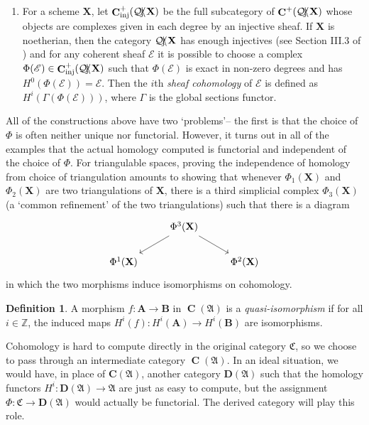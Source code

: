 \documentclass[a4paper]{article}
\theoremstyle{definition}
\newtheorem{defn}{Definition}[section]
\theoremstyle{remark}
\DeclareMathOperator{\Ch}{\mathbf{C}}
\DeclareMathOperator{\Qcoh}{\mathcal{Q \kern -2pt c\kern -3pt o\kern -2pt h\kern -1pt}}
\begin{document}
\begin{enumerate}
    \item For a scheme \(\mathbf{X}\), let
        \(\Ch_{\text{inj}}^+(\Qcoh\mathbf{X})\) be the full subcategory of
        \(\Ch^+(\Qcoh\mathbf{X})\) whose objects are complexes given in each
        degree by an injective sheaf. If \(\mathbf{X}\) is noetherian, then the
        category \(\Qcoh\mathbf{X}\) has enough injectives (see Section III.3 of
        ) and for any coherent sheaf
        \(\mathscr{E}\) it is possible to choose a complex
        \(\Phi(\mathscr{E})\in \Ch^+_{\text{inj}}(\Qcoh\mathbf{X})\) such that
        \(\Phi(\mathscr{E})\) is exact in non-zero degrees and has
        \(H^0(\Phi(\mathscr{E}))=\mathscr{E}\).  Then the \(i\)th \textit{sheaf
        cohomology} of \(\mathscr{E}\) is defined as
        \(H^i(\Gamma(\Phi(\mathscr{E})))\), where \(\Gamma\) is the global
        sections functor.
\end{enumerate}

All of the constructions above have two `problems'-- the first is that the
choice of \(\Phi\) is often neither unique nor functorial. However, it turns out
in all of the examples that the actual homology computed is functorial and
independent of the choice of \(\Phi\). For triangulable spaces, proving the
independence of homology from choice of triangulation amounts to showing that
whenever \(\Phi_1(\mathbf{X})\) and \(\Phi_2(\mathbf{X})\) are two
triangulations of \(\mathbf{X}\), there is a third simplicial complex
\(\Phi_3(\mathbf{X})\) (a `common refinement' of the two triangulations) such
that there is a diagram 
\[\begin{tikzcd}
    &\Phi^3(\mathbf{X})\arrow[dl] \arrow[dr]& \\
    \Phi^1(\mathbf{X}) & & \Phi^2(\mathbf{X})
\end{tikzcd}\]
in which the two morphisms induce isomorphisms on cohomology.
\begin{defn}
    A morphism \(f:\mathbf{A}\rightarrow \mathbf{B}\) in \(\Ch(\mathfrak{A})\)
    is a \textit{quasi-isomorphism} if for all \(i\in \mathbb{Z}\), the induced maps
    \(H^i(f): H^i(\mathbf{A})\rightarrow H^i(\mathbf{B})\) are isomorphisms.
\end{defn} 

Cohomology is hard to compute directly in the original category
\(\mathfrak{C}\), so we choose to pass through an intermediate category
\(\Ch(\mathfrak{A})\). In an ideal situation, we would have, in place of
\(\mathbf{C}(\mathfrak{A})\), another category \(\mathbf{D}(\mathfrak{A})\) such
that the homology functors \(H^i:\mathbf{D}(\mathfrak{A})\rightarrow \mathfrak{A}\)
are just as easy to compute, but the assignment \(\Phi: \mathfrak{C}\rightarrow
\mathbf{D}(\mathfrak{A})\) would actually be functorial. The derived category
will play this role.
\end{document}
